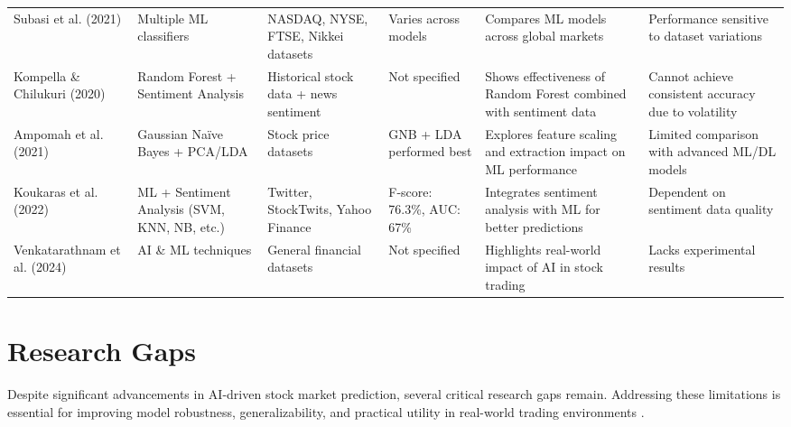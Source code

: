 \documentclass[11pt,a4paper]{article}
\begin{document}
{\begin{longtable}{L{2.0cm} L{2.2cm} L{2.4cm} L{2.6cm} L{2.8cm} L{2.5cm}}
Subasi et al. (2021) \cite{subasi2021} & Multiple ML classifiers & NASDAQ, NYSE, FTSE, Nikkei
datasets & Varies across models & Compares ML models across global markets & Performance
sensitive to dataset variations \\

Kompella \& Chilukuri (2020) \cite{kompella2020} & Random Forest + Sentiment Analysis &
Historical stock data + news sentiment & Not specified & Shows effectiveness of Random Forest
combined with sentiment data & Cannot achieve consistent accuracy due to volatility \\

Ampomah et al. (2021) \cite{ampomah2021} & Gaussian Na\"ive Bayes + PCA/LDA & Stock price
datasets & GNB + LDA performed best & Explores feature scaling and extraction impact on ML
performance & Limited comparison with advanced ML/DL models \\

Koukaras et al. (2022) \cite{koukaras2022} & ML + Sentiment Analysis (SVM, KNN, NB, etc.) &
Twitter, StockTwits, Yahoo Finance & F-score: 76.3\%, AUC: 67\% & Integrates sentiment analysis with
ML for better predictions & Dependent on sentiment data quality \\

Venkatarathnam et al. (2024) \cite{venkatarathnam2024} & AI \& ML techniques & General financial
datasets & Not specified & Highlights real-world impact of AI in stock trading & Lacks experimental
results \\

\end{longtable}
}

\section{Research Gaps}

Despite significant advancements in AI-driven stock market prediction, several critical research gaps
remain. Addressing these limitations is essential for improving model robustness, generalizability,
and practical utility in real-world trading environments \cite{rouf2021,chopra2021}.
\end{document}
